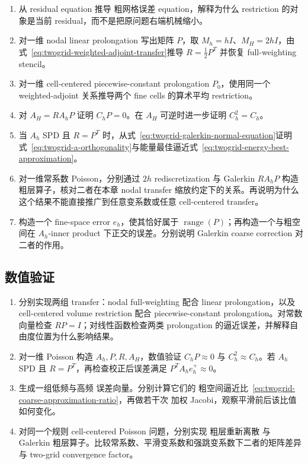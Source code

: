 \begin{enumerate}[label=\arabic*.]
\item 从 residual equation 推导 粗网格误差 equation，解释为什么 restriction 的对象是当前 residual，而不是把原问题右端机械缩小。

\item 对一维 nodal linear prolongation 写出矩阵 $P$，取 $M_h=hI$、$M_H=2hI$，由式~\eqref{eq:twogrid-weighted-adjoint-transfer}推导 $R=\frac12P^T$ 并恢复 full-weighting stencil。

\item 对一维 cell-centered piecewise-constant prolongation $P_0$，使用同一个 weighted-adjoint 关系推导两个 fine cells 的算术平均 restriction。

\item 对 $A_H=RA_hP$ 证明 $C_hP=0$。在 $A_H$ 可逆时进一步证明 $C_h^2=C_h$。

\item 当 $A_h$ SPD 且 $R=P^T$ 时，从式~\eqref{eq:twogrid-galerkin-normal-equation}证明式~\eqref{eq:twogrid-a-orthogonality}与能量最佳逼近式~\eqref{eq:twogrid-energy-best-approximation}。

\item 对一维常系数 Poisson，分别通过 $2h$ rediscretization 与 Galerkin $RA_hP$ 构造 粗层算子，核对二者在本章 nodal transfer 缩放约定下的关系。再说明为什么这个结果不能直接推广到任意变系数或任意 cell-centered transfer。

\item 构造一个 fine-space error $e_h$，使其恰好属于 $\operatorname{range}(P)$；再构造一个与粗空间在 $A_h$-inner product 下正交的误差。分别说明 Galerkin coarse correction 对二者的作用。
\end{enumerate}

\subsection*{数值验证}
\begin{enumerate}[label=\arabic*.]
\item 分别实现两组 transfer：nodal full-weighting 配合 linear prolongation，以及 cell-centered volume restriction 配合 piecewise-constant prolongation。对常数向量检查 $RP=I$；对线性函数检查两类 prolongation 的逼近误差，并解释自由度位置为什么影响结果。

\item 对一维 Poisson 构造 $A_h,P,R,A_H$，数值验证 $C_hP\approx0$ 与 $C_h^2\approx C_h$。若 $A_h$ SPD 且 $R=P^T$，再检查校正后误差满足 $P^TA_he_h^+\approx0$。

\item 生成一组低频与高频 误差向量。分别计算它们的 粗空间逼近比~\eqref{eq:twogrid-coarse-approximation-ratio}，再做若干次 加权 Jacobi，观察平滑前后该比值如何变化。

\item 对同一个规则 cell-centered Poisson 问题，分别实现 粗层重新离散 与 Galerkin 粗层算子。比较常系数、平滑变系数和强跳变系数下二者的矩阵差异与 two-grid convergence factor。
\end{enumerate}

